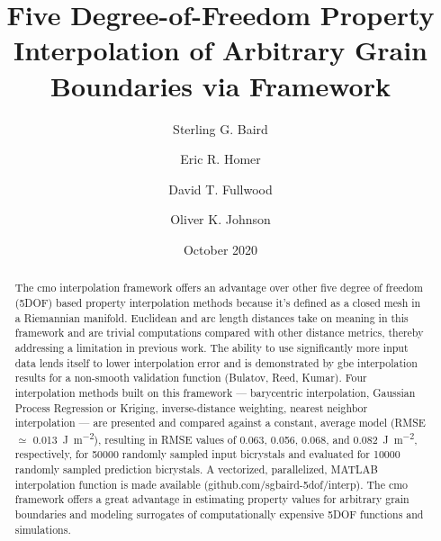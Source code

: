 \documentclass[preprint,12pt]{elsarticle}
\title{Five Degree-of-Freedom Property Interpolation of Arbitrary Grain Boundaries via \glsentrytitlecase{cmo}{long} Framework}
\author{Sterling G. Baird}
\author{Eric R. Homer}
\author{David T. Fullwood}
\author{Oliver K. Johnson\corref{cor1}}
\date{October 2020}
\begin{document}
\begin{abstract}
    The \acrlong{cmo} interpolation framework offers an advantage over other five degree of freedom (5DOF) based property interpolation methods because it's defined as a closed mesh in a Riemannian manifold. Euclidean and arc length distances take on meaning in this framework and are trivial computations compared with other distance metrics, thereby addressing a limitation in previous work. The ability to use significantly more input data lends itself to lower interpolation error and is demonstrated by \acrlong{gbe} interpolation results for a non-smooth validation function (Bulatov, Reed, Kumar).
    Four interpolation methods built on this framework --- barycentric interpolation, Gaussian Process Regression or Kriging, inverse-distance weighting, nearest neighbor interpolation --- are presented and compared against a constant, average model (RMSE $\simeq$ \SI{0.013}{\J\per\square\meter}), resulting in RMSE values of 0.063, 0.056, 0.068, and \SI{0.082}{\J\per\square\meter}, respectively, for \num{50000} randomly sampled input bicrystals and evaluated for \num{10000} randomly sampled prediction bicrystals. A vectorized, parallelized, MATLAB interpolation function is made available (github.com/sgbaird-5dof/interp). The \acrlong{cmo} framework offers a great advantage in estimating property values for arbitrary grain boundaries and modeling surrogates of computationally expensive 5DOF functions and simulations.
\end{abstract}
\end{document}
